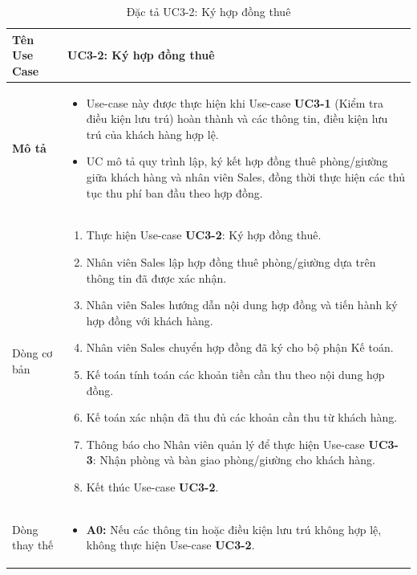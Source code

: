 \noindent
\begin{table}[H]
    \centering
\begin{tabularx}{\textwidth}{|>{\centering\arraybackslash\bfseries}m{3.5cm}|X|}
    \hline
    Tên Use Case & {\centering\textbf{UC3-2: Ký hợp đồng thuê}\par} \\ 
    \hline

    Mô tả &
    \vspace{0.2cm}
    \begin{itemize}[leftmargin=*, nosep, label=-]
        \item Use-case này được thực hiện khi Use-case \textbf{UC3-1} (Kiểm tra điều kiện lưu trú) hoàn thành và các thông tin, điều kiện lưu trú của khách hàng hợp lệ.
        \item UC mô tả quy trình lập, ký kết hợp đồng thuê phòng/giường giữa khách hàng và nhân viên Sales, đồng thời thực hiện các thủ tục thu phí ban đầu theo hợp đồng.
    \end{itemize} \\ 
    \hline

    Dòng cơ bản &
    \vspace{0.2cm}
    \begin{enumerate}[leftmargin=*, nosep]
        \item Thực hiện Use-case \textbf{UC3-2}: Ký hợp đồng thuê.
        \item Nhân viên Sales lập hợp đồng thuê phòng/giường dựa trên thông tin đã được xác nhận.
        \item Nhân viên Sales hướng dẫn nội dung hợp đồng và tiến hành ký hợp đồng với khách hàng.
        \item Nhân viên Sales chuyển hợp đồng đã ký cho bộ phận Kế toán.
        \item Kế toán tính toán các khoản tiền cần thu theo nội dung hợp đồng.
        \item Kế toán xác nhận đã thu đủ các khoản cần thu từ khách hàng.
        \item Thông báo cho Nhân viên quản lý để thực hiện Use-case \textbf{UC3-3}: Nhận phòng và bàn giao phòng/giường cho khách hàng.
        \item Kết thúc Use-case \textbf{UC3-2}.
    \end{enumerate} \\ 
    \hline

    Dòng thay thế &
    \vspace{0.2cm}
    \begin{itemize}[leftmargin=*, nosep, label=-]
        \item \textbf{A0:} Nếu các thông tin hoặc điều kiện lưu trú không hợp lệ, không thực hiện Use-case \textbf{UC3-2}.
    \end{itemize} \\ 
    \hline
\end{tabularx}
\caption{Đặc tả UC3-2: Ký hợp đồng thuê}
\end{table}

